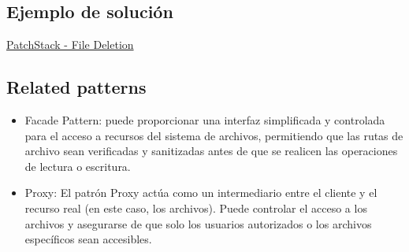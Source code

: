 \subsection*{Ejemplo de solución}
\href{https://patchstack.com/academy/wordpress/securing-code/arbitrary-file-deletion/}{PatchStack - File Deletion}
\subsection*{Related patterns}
\begin{itemize}
    \item Facade Pattern: puede proporcionar una interfaz simplificada y controlada para el acceso
    a recursos del sistema de archivos, permitiendo que las rutas de archivo sean verificadas
    y sanitizadas antes de que se realicen las operaciones de lectura o escritura.
    \item Proxy: El patrón Proxy actúa como un intermediario entre el cliente y el recurso real (en este caso, los archivos). Puede controlar el acceso a los archivos y asegurarse de que solo los usuarios autorizados o los archivos específicos sean accesibles.
\end{itemize}

